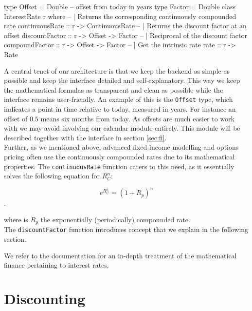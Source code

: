
\begin{hscode}
type Offset = Double -- offset from today in years
type Factor = Double
class InterestRate r where
  -- | Returns the corresponding continuously compounded rate
  continuousRate :: r -> ContinuousRate
  -- | Returns the discount factor at an offset
  discountFactor :: r -> Offset -> Factor 
  -- | Reciprocal of the discount factor
  compoundFactor :: r -> Offset -> Factor 
  -- | Get the intrinsic rate
  rate           :: r -> Rate
\end{hscode}

A central tenet of our architecture is that we keep the backend
as simple as possible and keep the interface detailed and 
self-explanatory. This way we keep the mathematical formulas as transparent
and clean as possible while the interface remains user-friendly. An example
of this is the \texttt{Offset} type, which indicates a point in 
time relative to today, measured in years. For instance an offset of $0.5$
means six months from today. As offsets are much easier to work with we may 
avoid involving our calendar module entirely. This module will be described
together with the interface in section \ref{sec:fi}.\\

Further, as we mentioned above, advanced fixed income modelling and options 
pricing often use the continuously compounded rates due to its mathematical 
properties\cite{HULL}. The \texttt{continuousRate} function caters to this
need, as it essentially solves the following equation for $R_C^n$:

\begin{equation}
e^{R_C^n} = (1+R_p)^n
\end{equation}.

where is $R_p$ the exponentially (periodically) compounded rate.\\

The \texttt{discountFactor} function introduces concept that we
explain in the following section.

We refer to the \hql documentation\cite{hqldoc} for an in-depth treatment of the
mathematical finance pertaining to interest rates.

\section{Discounting}\label{sec:discounting}

